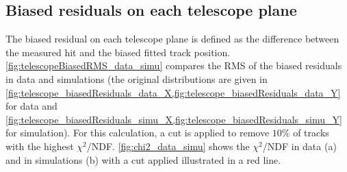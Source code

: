 \newpage
\subsection{Biased residuals on each telescope plane}

The biased residual on each telescope plane is defined as the
difference between the measured hit and the biased fitted track
position. \cref{fig:telescopeBiasedRMS_data_simu} compares the RMS of
the biased residuals in data and simulations (the original
distributions are given in
\cref{fig:telescope_biasedResiduals_data_X,fig:telescope_biasedResiduals_data_Y}
for data and
\cref{fig:telescope_biasedResiduals_simu_X,fig:telescope_biasedResiduals_simu_Y}
for simulation). For this calculation, a cut is applied to remove
$10\%$ of tracks with the highest
$\chi^2$/NDF. \cref{fig:chi2_data_simu} shows the $\chi^2$/NDF in data
(a) and in simulations (b) with a cut applied illustrated in a red
line.
